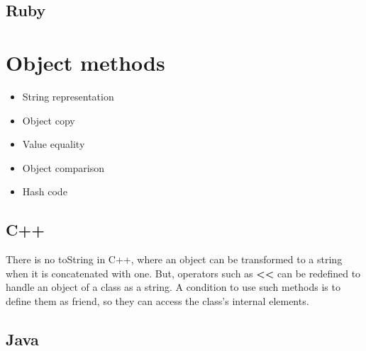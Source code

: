 \documentclass{KodeBook}
\begin{document}


\subsection{Ruby}








\section{Object methods}

\begin{itemize}
	\item String representation
	\item Object copy
	\item Value equality
	\item Object comparison
	\item Hash code
\end{itemize}


\subsection{C++}

There is no toString in C++, where an object can be transformed to a string when it is concatenated with one. 
But, operators such as \textbf{<<} can be redefined to handle an object of a class as a string. 
A condition to use such methods is to define them as friend, so they can access the class's internal elements.  



\subsection{Java}




\end{document}
